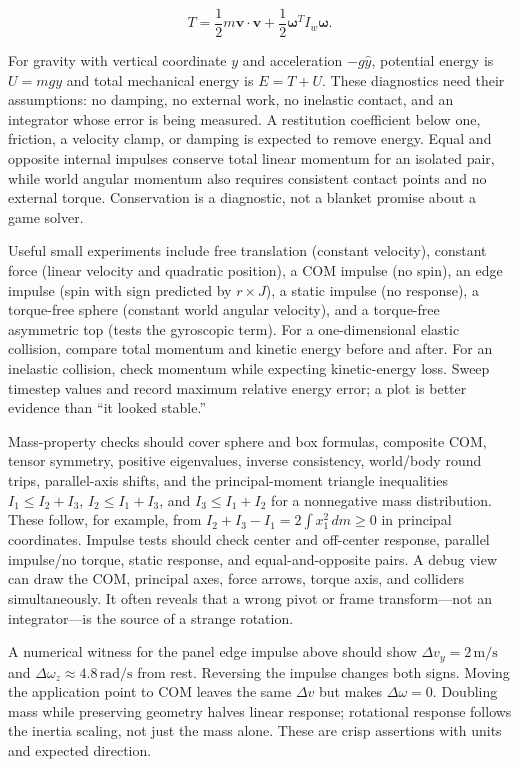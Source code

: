 \[
T=\frac12m\mathbf v\cdot\mathbf v+\frac12\boldsymbol\omega^T I_w\boldsymbol\omega.
\]

For gravity with vertical coordinate \(y\) and acceleration \(-g\hat y\), potential energy is \(U=mgy\) and total mechanical energy is \(E=T+U\). These diagnostics need their assumptions: no damping, no external work, no inelastic contact, and an integrator whose error is being measured. A restitution coefficient below one, friction, a velocity clamp, or damping is expected to remove energy. Equal and opposite internal impulses conserve total linear momentum for an isolated pair, while world angular momentum also requires consistent contact points and no external torque. Conservation is a diagnostic, not a blanket promise about a game solver.

Useful small experiments include free translation (constant velocity), constant force (linear velocity and quadratic position), a COM impulse (no spin), an edge impulse (spin with sign predicted by \(r\times J\)), a static impulse (no response), a torque-free sphere (constant world angular velocity), and a torque-free asymmetric top (tests the gyroscopic term). For a one-dimensional elastic collision, compare total momentum and kinetic energy before and after. For an inelastic collision, check momentum while expecting kinetic-energy loss. Sweep timestep values and record maximum relative energy error; a plot is better evidence than ``it looked stable.''

Mass-property checks should cover sphere and box formulas, composite COM, tensor symmetry, positive eigenvalues, inverse consistency, world/body round trips, parallel-axis shifts, and the principal-moment triangle inequalities \(I_1\le I_2+I_3\), \(I_2\le I_1+I_3\), and \(I_3\le I_1+I_2\) for a nonnegative mass distribution. These follow, for example, from \(I_2+I_3-I_1=2\int x_1^2\,dm\ge0\) in principal coordinates. Impulse tests should check center and off-center response, parallel impulse/no torque, static response, and equal-and-opposite pairs. A debug view can draw the COM, principal axes, force arrows, torque axis, and colliders simultaneously. It often reveals that a wrong pivot or frame transform---not an integrator---is the source of a strange rotation.

A numerical witness for the panel edge impulse above should show \(\Delta v_y=2\,\mathrm{m/s}\) and \(\Delta\omega_z\approx4.8\,\mathrm{rad/s}\) from rest. Reversing the impulse changes both signs. Moving the application point to COM leaves the same \(\Delta v\) but makes \(\Delta\omega=0\). Doubling mass while preserving geometry halves linear response; rotational response follows the inertia scaling, not just the mass alone. These are crisp assertions with units and expected direction.

